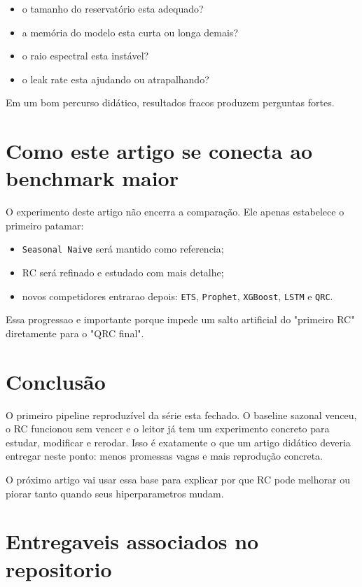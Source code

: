 \documentclass[12pt]{article}
\providecommand{\tightlist}{%
          \setlength{\itemsep}{0pt}\setlength{\parskip}{0pt}}
\begin{document}
\begin{itemize}
\tightlist
\item
  o tamanho do reservatório esta adequado?
\item
  a memória do modelo esta curta ou longa demais?
\item
  o raio espectral esta instável?
\item
  o leak rate esta ajudando ou atrapalhando?
\end{itemize}

Em um bom percurso didático, resultados fracos produzem perguntas fortes.

\section{Como este artigo se conecta ao benchmark maior}\label{9-como-este-artigo-se-conecta-ao-benchmark-maior}

O experimento deste artigo não encerra a comparação. Ele apenas estabelece o primeiro patamar:

\begin{itemize}
\tightlist
\item
  \texttt{Seasonal\ Naive} será mantido como referencia;
\item
  RC será refinado e estudado com mais detalhe;
\item
  novos competidores entrarao depois: \texttt{ETS}, \texttt{Prophet}, \texttt{XGBoost}, \texttt{LSTM} e \texttt{QRC}.
\end{itemize}

Essa progressao e importante porque impede um salto artificial do "primeiro RC" diretamente para o "QRC final".

\section{Conclusão}\label{10-conclusuxe3o}

O primeiro pipeline reproduzível da série esta fechado. O baseline sazonal venceu, o RC funcionou sem vencer e o leitor já tem um experimento concreto para estudar, modificar e rerodar. Isso é exatamente o que um artigo didático deveria entregar neste ponto: menos promessas vagas e mais reprodução concreta.

O próximo artigo vai usar essa base para explicar por que RC pode melhorar ou piorar tanto quando seus hiperparametros mudam.

\section{Entregaveis associados no repositorio}\label{entregaveis-associados-no-repositorio}
\end{document}
